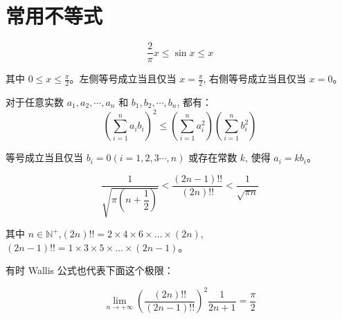 \documentclass[lang=cn,10pt,twoside]{elegantbook}
\begin{document}
\section{常用不等式}
\begin{theorem}
  \begin{equation*}
    \frac 2 \pi x \leq \sin x \leq x
  \end{equation*}

  其中 $0 \leq x \leq \frac \pi 2$。左侧等号成立当且仅当 $x = \frac \pi 2$, 右侧等号成立当且仅当 $x = 0$。
\end{theorem}
\begin{theorem}[柯西不等式]
  对于任意实数 $a_1, a_2, \cdots, a_n$ 和 $b_1, b_2, \cdots, b_n$, 都有：
  \begin{equation*}
    \left(\sum_{i=1}^n a_ib_i\right)^2 \leq \left(\sum_{i=1}^n a_i^2\right)\left(\sum_{i=1}^n b_i^2\right)
  \end{equation*}

  等号成立当且仅当 $b_i=0(i = 1,2,3\cdots, n)$ 或存在常数 $k$, 使得 $a_i = kb_i$。
\end{theorem}
\begin{theorem}
  \begin{equation*}
    \frac 1{\sqrt{\pi \left(n + \dfrac 12\right)}} < \frac{(2n-1)!!}{(2n)!!} < \frac{1}{\sqrt{\pi n}}
  \end{equation*}
  
  其中 $n \in \mathbb{N}^+$,$(2n)!! = 2 \times 4 \times 6 \times \dots \times (2n)$,$(2n-1)!! = 1 \times 3 \times 5 \times \dots \times (2n-1)$。
  
  有时 Wallis 公式也代表下面这个极限：

  \begin{equation*}
    \lim_{n \rightarrow +\infty} \left(\frac{(2n)!!}{(2n-1)!!}\right)^2 \frac{1}{2n+1} = \frac{\pi}2
  \end{equation*}
\end{theorem}
\end{document}

